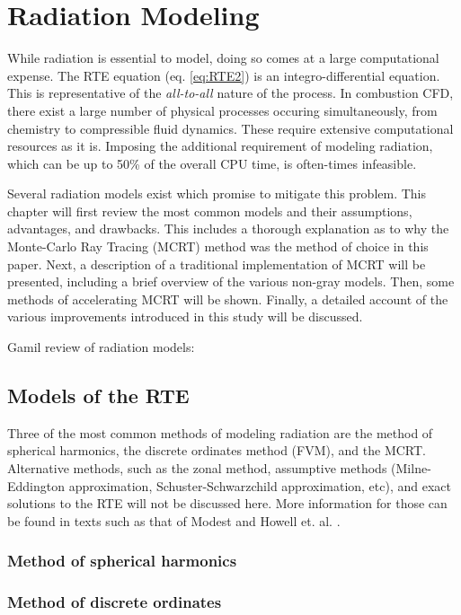\addchapheadtotoc
\chapter{Radiation Modeling}\label{chapter:Modeling}
While radiation is essential to model, doing so comes at a large computational expense. 
The RTE equation (eq. \ref{eq:RTE2}) is an integro-differential equation. This is representative of the \textit{all-to-all} nature of the process. In combustion CFD, there exist a large number of physical processes occuring simultaneously, from chemistry to compressible fluid dynamics. 
These require extensive computational resources as it is. Imposing the additional requirement of modeling radiation, which can be up to 50\% of the overall CPU time, is often-times infeasible.

Several radiation models exist which promise to mitigate this problem. This chapter will first review the most common models and their assumptions, advantages, and drawbacks. 
This includes a thorough explanation as to why the Monte-Carlo Ray Tracing (MCRT) method was the method of choice in this paper.
Next, a description of a traditional implementation of MCRT will be presented, including a brief overview of the various non-gray models.
Then, some methods of accelerating MCRT will be shown.
Finally, a detailed account of the various improvements introduced in this study will be discussed.

Gamil review of radiation models: \cite{Gamil2020AssessmentChamber}

\section{Models of the RTE}
Three of the most common methods of modeling radiation are the method of spherical harmonics, the discrete ordinates method (FVM), and the MCRT. Alternative methods, such as the zonal method, assumptive methods (Milne-Eddington approximation, Schuster-Schwarzchild approximation, etc), and exact solutions to the RTE will not be discussed here.
More information for those can be found in texts such as that of Modest \cite{Modest2013RadiativeTransfer} and Howell et. al. \cite{Howell2010ThermalTransfer}.

\subsection{Method of spherical harmonics}
\subsection{Method of discrete ordinates}
